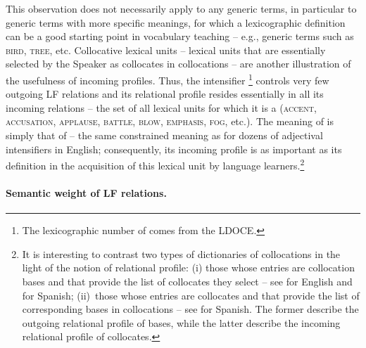 This observation does not necessarily apply to any generic terms, in particular to generic terms with more specific meanings, for which a lexicographic definition can be a good starting point in vocabulary teaching -- e.g., generic terms such as \textsc{bird}, \textsc{tree}, etc. Collocative lexical units -- lexical units that are essentially selected by the Speaker as collocates in collocations -- are another illustration of the usefulness of incoming profiles. Thus, the intensifier \label{txt:HEAVY-Adj-2} \footnote{The lexicographic number of  comes from the LDOCE.} controls very few outgoing LF relations and its relational profile resides essentially in all its incoming  relations -- the set of all lexical units for which it is a  (\textsc{accent}, \textsc{accusation}, \textsc{applause}, \textsc{battle}, \textsc{blow}, \textsc{emphasis}, \textsc{fog}, etc.). The meaning of  is simply that of  -- the same constrained meaning as for dozens of adjectival intensifiers in English; consequently, its incoming profile is as important as its definition in the acquisition of this lexical unit by language learners.\footnote{It is interesting to contrast two types of dictionaries of collocations in the light of the notion of relational profile: (i) those whose entries are collocation bases and that provide the list of collocates they select -- see \textcite{BensonEtAl2010} for English and \textcite{Bosque2006} for Spanish; (ii)~those whose entries are collocates and that provide the list of corresponding bases in collocations -- see \textcite{Bosque2010} for Spanish. The former describe the outgoing relational profile of bases, while the latter describe the incoming relational profile of collocates.}

\paragraph*{Semantic weight of LF relations.}\label{par:semanticWeightLFRelation}

